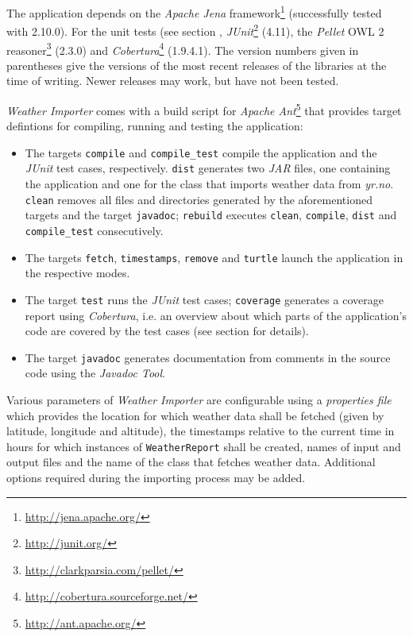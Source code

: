 The application depends on the \emph{Apache Jena} framework\footnote{\href{http://jena.apache.org/}{http://jena.apache.org/}} (successfully tested with 2.10.0). For the unit tests (see section \label{sec:importer_tests}, \emph{JUnit}\footnote{\href{http://junit.org/}{http://junit.org/}} (4.11), the \emph{Pellet} OWL 2 reasoner\footnote{\href{http://clarkparsia.com/pellet/}{http://clarkparsia.com/pellet/}} (2.3.0) and \emph{Cobertura}\footnote{\href{http://cobertura.sourceforge.net/}{http://cobertura.sourceforge.net/}} (1.9.4.1). The version numbers given in parentheses give the versions of the most recent releases of the libraries at the time of writing. Newer releases may work, but have not been tested.

\emph{Weather Importer} comes with a build script for \emph{Apache Ant}\footnote{\href{http://ant.apache.org/}{http://ant.apache.org/}} that provides target defintions for compiling, running and testing the application:

\begin{itemize}
  \item The targets \texttt{compile} and \texttt{compile\_test} compile the application and the \emph{JUnit} test cases, respectively. \texttt{dist} generates two \emph{JAR} files, one containing the application and one for the class that imports weather data from \emph{yr.no}. \texttt{clean} removes all files and directories generated by the aforementioned targets and the target \texttt{javadoc}; \texttt{rebuild} executes \texttt{clean}, \texttt{compile}, \texttt{dist} and \texttt{compile\_test} consecutively.
  \item The targets \texttt{fetch}, \texttt{timestamps}, \texttt{remove} and \texttt{turtle} launch the application in the respective modes.
  \item The target \texttt{test} runs the \emph{JUnit} test cases; \texttt{coverage} generates a coverage report using \emph{Cobertura}, i.e. an overview about which parts of the application's code are covered by the test cases (see section \label{sec:importer_tests} for details).
  \item The target \texttt{javadoc} generates documentation from comments in the source code using the \emph{Javadoc Tool}.
\end{itemize}

Various parameters of \emph{Weather Importer} are configurable using a \emph{properties file} which provides the location for which weather data shall be fetched (given by latitude, longitude and altitude), the timestamps relative to the current time in hours for which instances of \texttt{WeatherReport} shall be created, names of input and output files and the name of the class that fetches weather data. Additional options required during the importing process may be added.

